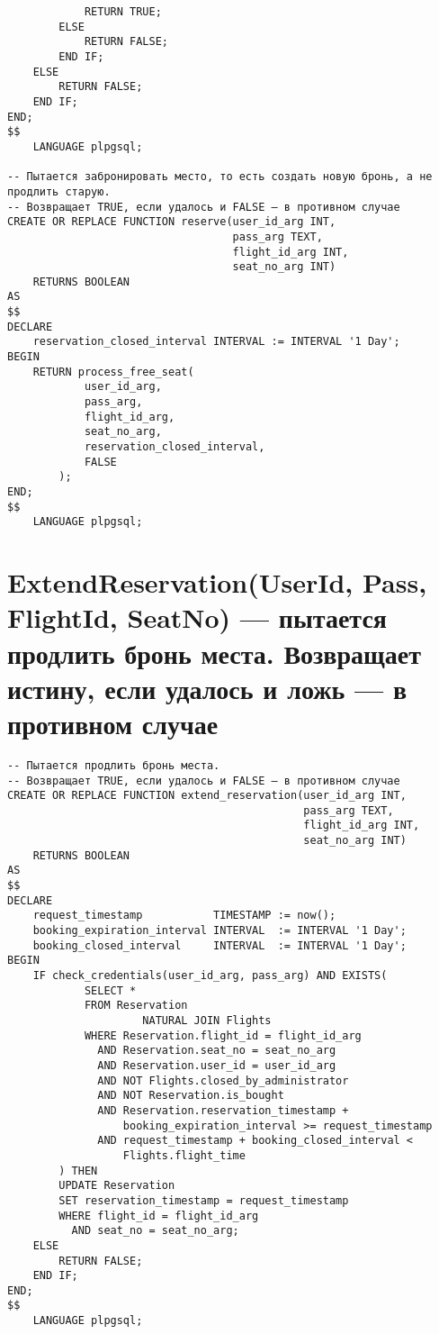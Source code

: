 \documentclass{article}
\begin{document}
\begin{verbatim}
            RETURN TRUE;
        ELSE
            RETURN FALSE;
        END IF;
    ELSE
        RETURN FALSE;
    END IF;
END;
$$
    LANGUAGE plpgsql;

-- Пытается забронировать место, то есть создать новую бронь, а не продлить старую.
-- Возвращает TRUE, если удалось и FALSE — в противном случае
CREATE OR REPLACE FUNCTION reserve(user_id_arg INT,
                                   pass_arg TEXT,
                                   flight_id_arg INT,
                                   seat_no_arg INT)
    RETURNS BOOLEAN
AS
$$
DECLARE
    reservation_closed_interval INTERVAL := INTERVAL '1 Day';
BEGIN
    RETURN process_free_seat(
            user_id_arg,
            pass_arg,
            flight_id_arg,
            seat_no_arg,
            reservation_closed_interval,
            FALSE
        );
END;
$$
    LANGUAGE plpgsql;
\end{verbatim}

\section{ExtendReservation(UserId, Pass, FlightId, SeatNo) — пытается продлить бронь места. Возвращает истину, если удалось и ложь — в противном случае}

\begin{verbatim}
-- Пытается продлить бронь места.
-- Возвращает TRUE, если удалось и FALSE — в противном случае
CREATE OR REPLACE FUNCTION extend_reservation(user_id_arg INT,
                                              pass_arg TEXT,
                                              flight_id_arg INT,
                                              seat_no_arg INT)
    RETURNS BOOLEAN
AS
$$
DECLARE
    request_timestamp           TIMESTAMP := now();
    booking_expiration_interval INTERVAL  := INTERVAL '1 Day';
    booking_closed_interval     INTERVAL  := INTERVAL '1 Day';
BEGIN
    IF check_credentials(user_id_arg, pass_arg) AND EXISTS(
            SELECT *
            FROM Reservation
                     NATURAL JOIN Flights
            WHERE Reservation.flight_id = flight_id_arg
              AND Reservation.seat_no = seat_no_arg
              AND Reservation.user_id = user_id_arg
              AND NOT Flights.closed_by_administrator
              AND NOT Reservation.is_bought
              AND Reservation.reservation_timestamp +
                  booking_expiration_interval >= request_timestamp
              AND request_timestamp + booking_closed_interval <
                  Flights.flight_time
        ) THEN
        UPDATE Reservation
        SET reservation_timestamp = request_timestamp
        WHERE flight_id = flight_id_arg
          AND seat_no = seat_no_arg;
    ELSE
        RETURN FALSE;
    END IF;
END;
$$
    LANGUAGE plpgsql;
\end{verbatim}
\end{document}

